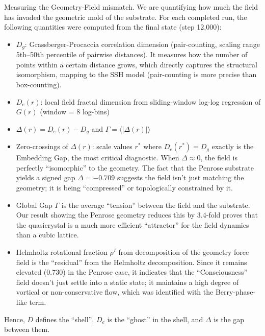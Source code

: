 \documentclass[11pt,a4paper]{article}
\begin{document}
Measuring the Geometry-Field mismatch. We are quantifying how much the field has invaded the geometric mold of the substrate. For each completed run, the following quantities were computed from the final state (step 12,000):

\begin{itemize}
\item $D_g$: Grassberger-Procaccia correlation dimension (pair-counting, scaling range 5th--50th percentile of pairwise distances). It measures how the number of points within a certain distance grows, which directly captures the structural isomorphism, mapping to the SSH model (pair-counting is more precise than box-counting).

\item $D_e(r)$: local field fractal dimension from sliding-window log-log regression of $G(r)$ (window = 8 log-bins)

\item $\Delta(r) = D_e(r) - D_g$ and $\Gamma = \langle|\Delta(r)|\rangle$

\item Zero-crossings of $\Delta(r)$: scale values $r^*$ where $D_e(r^*) = D_g$ exactly is the Embedding Gap, the most critical diagnostic. When $\Delta \approx 0$, the field is perfectly ``isomorphic'' to the geometry. The fact that the Penrose substrate yields a signed gap $\Delta = -0.709$ suggests the field isn't just matching the geometry; it is being ``compressed'' or topologically constrained by it.

\item Global Gap $\Gamma$ is the average ``tension'' between the field and the substrate. Our result showing the Penrose geometry reduces this by 3.4-fold proves that the quasicrystal is a much more efficient ``attractor'' for the field dynamics than a cubic lattice.

\item Helmholtz rotational fraction $\rho^I$ from decomposition of the geometry force field is the ``residual'' from the Helmholtz decomposition. Since it remains elevated (0.730) in the Penrose case, it indicates that the ``Consciousness'' field doesn't just settle into a static state; it maintains a high degree of vortical or non-conservative flow, which was identified with the Berry-phase-like term.
\end{itemize}

Hence, $D$ defines the ``shell'', $D_e$ is the ``ghost'' in the shell, and $\Delta$ is the gap between them.
\end{document}
